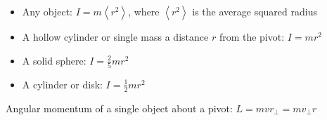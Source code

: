 \documentclass[12pt]{article}
\def\LL{\left\langle}   %
\def\RR{\right\rangle}  %
\begin{document}
  \begin{itemize}
    \item{Any object: $I=m \LL r^2 \RR$, where $\LL r^2 \RR$ is the average squared radius}
    \item{A hollow cylinder or single mass a distance $r$ from the pivot: $I=mr^2$}
    \item{A solid sphere: $I=\frac{2}{5}mr^2$}
    \item{A cylinder or disk: $I=\frac{1}{2}mr^2$}
  \end{itemize}

\bigskip

Angular momentum of a single object about a pivot: $L = mvr_\perp = m v_\perp r$
\end{document}
